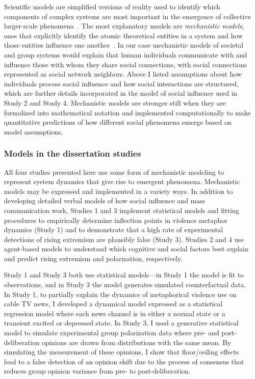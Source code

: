 Scientific models are simplified versions of reality used to identify which components of
complex systems are most important in the emergence of collective larger-scale
phenomena~\cite{Kauffman1970,Wimsatt1972,Wimsatt1997,Machamer2000,Wimsatt2007,Smaldino2017}.
The most explanatory models are \emph{mechanistic models}, ones that explicitly identify the atomic theoretical 
entities in a system and how those entities influence one another~\cite{Machamer2000,Craver2006,Turner2021}. 
In our case mechanistic models of societal and group systems would explain that
human individuals communicate with and influence those with whom they share
social connections, with social connections represented as social network neighbors. 
Above I listed
assumptions about how individuals process social influence and how social
interactions are structured, which are further details incorporated in the
model of social influence used in Study 2 and Study 4. 
Mechanistic models are stronger still when they are 
formalized into mathematical notation and implemented computationally to
make quantitative predictions of how different social phenomena emerge based
on model assumptions. 


\subsubsection{Models in the dissertation studies}

All four studies presented here use some form of mechanistic modeling to 
represent system dynamics that give rise to emergent phenomena. Mechanistic
models may be expressed and implemented in a variety ways. In addition to 
developing detailed verbal models of how social influence and mass
communication work, Studies 1 and 3 implement statistical models and 
fitting procedures to empirically
determine inflection points in violence metaphor dynamics (Study 1) and 
to demonstrate that a high rate of experimental detections of rising extremism
are plausibly false (Study 3). Studies 2 and 4 use 
agent-based models to understand which cognitive and social factors best explain
and predict rising extremism and polarization, respectively.

Study 1 and Study 3 both use statistical models---in Study 1 the model is fit
to observations, and in Study 3 the model generates simulated counterfactual
data. In Study 1, to partially explain the dynamics of metaphorical violence use on cable TV news,
I developed a dynamical model expressed as a statistical regression
model where each news channel is in either a normal state or a 
transient excited or depressed state.  
In Study 3, I used a generative 
statistical model to simulate experimental group polarization data where
pre- and post-deliberation opinions are drawn from distributions with the
same mean. By simulating the measurement of these opinions, I show
that floor/ceiling effects lead to a false detection of an opinion shift due to
the process of consensus that reduces group opinion variance from
pre- to post-deliberation.

